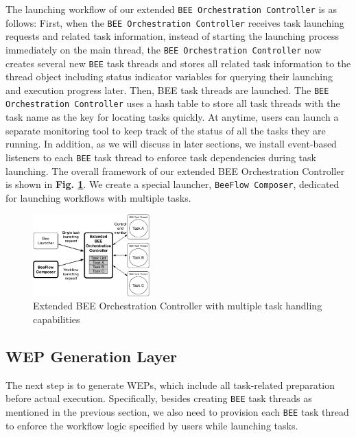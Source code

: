 The launching workflow of our extended \texttt{BEE Orchestration Controller} is as follows: First, when the \texttt{BEE Orchestration Controller} receives task launching requests and related task information, instead of starting the launching process immediately on the main thread, the \texttt{BEE Orchestration Controller} now creates several new \texttt{BEE} task threads and stores all related task information to the thread object including status indicator variables for querying their launching and execution progress later. Then, BEE task threads are launched. The \texttt{BEE Orchestration Controller} uses a hash table to store all task threads with the task name as the key for locating tasks quickly. At anytime, users can launch a separate monitoring tool to keep track of the status of all the tasks they are running. In addition, as we will discuss in later sections, we install event-based listeners to each \texttt{BEE} task thread to enforce task dependencies during task launching. The overall framework of our extended BEE Orchestration Controller is shown in \textbf{Fig. \ref{orc}}. We create a special launcher, \texttt{BeeFlow Composer}, dedicated for launching workflows with multiple tasks. 

\begin{figure}[h]
    \centering
    \includegraphics[width=0.4\textwidth]{figures/orc_ctl.pdf}
    \caption{Extended BEE Orchestration Controller with multiple task handling capabilities}
    \label{orc}
    
\end{figure}

\subsection{WEP Generation Layer}
The next step is to generate WEPs, which include all task-related preparation before actual execution. Specifically, besides creating \texttt{BEE} task threads as mentioned in the previous section, we also need to provision each \texttt{BEE} task thread to enforce the workflow logic specified by users while launching tasks. 

